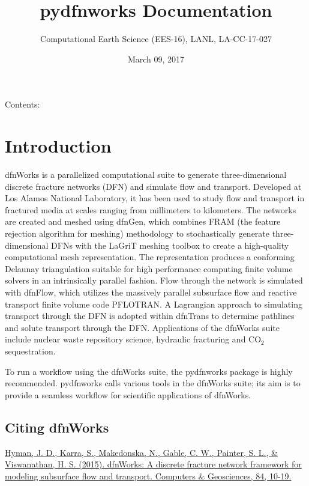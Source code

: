 \documentclass[letterpaper,10pt,english]{sphinxmanual}
\title{pydfnworks Documentation}
\date{March 09, 2017}
\author{Computational Earth Science (EES-16), LANL, LA-CC-17-027}
\begin{document}
\maketitle
\tableofcontents
{}\label{index::doc}


Contents:


\chapter{Introduction}
\label{intro:introduction}\label{intro:welcome-to-dfnworks-2-0-documentation}\label{intro::doc}
dfnWorks is a parallelized computational suite to generate three-dimensional discrete fracture networks (DFN) and simulate flow and transport. Developed at Los Alamos National Laboratory, it has been used to study flow and transport in fractured media at scales ranging from millimeters to kilometers. The networks are created and meshed using dfnGen, which combines FRAM (the feature rejection algorithm for meshing) methodology to stochastically generate three-dimensional DFNs with the LaGriT meshing toolbox to create a high-quality computational mesh representation. The representation produces a conforming Delaunay triangulation suitable for high performance computing finite volume solvers in an intrinsically parallel fashion. Flow through the network is simulated with dfnFlow, which utilizes the massively parallel subsurface flow and reactive transport finite volume code PFLOTRAN. A Lagrangian approach to simulating transport through the DFN is adopted within dfnTrans to determine pathlines and solute transport through the DFN. Applications of the dfnWorks suite include nuclear waste repository science, hydraulic fracturing and CO$_{\text{2}}$ sequestration.

To run a workflow using the dfnWorks suite, the pydfnworks package is highly recommended. pydfnworks calls various tools in the dfnWorks suite; its aim is to provide a seamless workflow for scientific applications of dfnWorks.


\section{Citing dfnWorks}
\label{intro:citing-dfnworks}
\href{http://www.sciencedirect.com/science/article/pii/S0098300415300261/}{Hyman, J. D., Karra, S., Makedonska, N., Gable, C. W., Painter, S. L., \& Viswanathan, H. S. (2015). dfnWorks: A discrete fracture network framework for modeling subsurface flow and transport. Computers \& Geosciences, 84, 10-19.}
\end{document}
